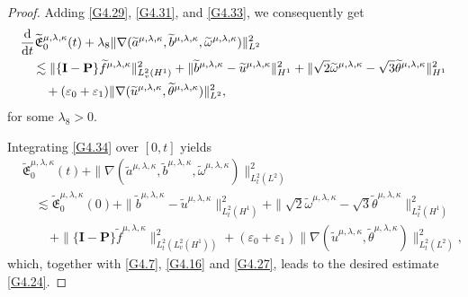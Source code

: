 \documentclass[reqno,11pt]{amsart}
\theoremstyle{plain}
\numberwithin{equation}{section}
\newcommand{\eps}{{\varepsilon}}
\begin{document}
\begin{proof}
Adding   \eqref{G4.29}, \eqref{G4.31}, and \eqref{G4.33}, we consequently get
\begin{align}\label{G4.34}
&\frac{{\rm d}}{{\rm d} t}\widetilde{\mathfrak{E}}^{\mu,\lambda,\kappa}_0(t)+\lambda_8 \|\nabla(\widetilde{a}^{\mu,\lambda,\kappa},\widetilde{b}^{\mu,\lambda,\kappa},\widetilde{\omega}^{\mu,\lambda,\kappa})\|_{L^2}^2\nonumber\\
&\quad\lesssim  \|\{\mathbf{I}-\mathbf{P}\} \widetilde{f}^{\mu,\lambda,\kappa}\|_{L_v^2 (H^1 )}^2+ \|\widetilde{b}^{\mu,\lambda,\kappa}-\widetilde{u}^{\mu,\lambda,\kappa}\|_{H^1}^2+\|\sqrt{2}\widetilde\omega^{\mu,\lambda,\kappa}-\sqrt{3}\widetilde{\theta}^{\mu,\lambda,\kappa}\|_{H^1}^2\nonumber\\
& \quad\quad+(\eps_0+\eps_1)\|\nabla( \widetilde{u}^{\mu,\lambda,\kappa},\widetilde{\theta}^{\mu,\lambda,\kappa})\|_{L^2}^2,   
\end{align}
for some $\lambda_8>0$.

Integrating \eqref{G4.34} over $[0,t]$ yields
\begin{align*}
&\widetilde{\mathfrak{E}}_0^{\mu,\lambda,\kappa}(t)+\|\nabla(\widetilde{a}^{\mu,\lambda,\kappa},\widetilde{b}^{\mu,\lambda,\kappa},\widetilde{\omega}^{\mu,\lambda,\kappa})\|_{L_t^2(L^2)}^2\nonumber\\
&\quad \lesssim\widetilde{\mathfrak{E}}_0^{\mu,\lambda,\kappa}(0)+\|\widetilde{b}^{\mu,\lambda,\kappa}-\widetilde{u}^{\mu,\lambda,\kappa}\|_{L_t^2(H^1)}^2
+\|\sqrt{2}\widetilde\omega^{\mu,\lambda,\kappa}-\sqrt{3}\widetilde{\theta}^{\mu,\lambda,\kappa}\|_{L_t^2(H^1)}^2\nonumber\\
&\qquad \, +\|\{\mathbf{I}-\mathbf{P}\} \widetilde{f}^{\mu,\lambda,\kappa}\|_{L_t^2(L_v^2 (H^1 ))}^2+(\eps_0+\eps_1)\|\nabla(\widetilde{u}^{\mu,\lambda,\kappa},\widetilde{\theta}^{\mu,\lambda,\kappa})\|_{L_t^2(L^2)}^2,
\end{align*}
which, together with \eqref{G4.7}, \eqref{G4.16}  and  \eqref{G4.27}, leads to  the desired estimate \eqref{G4.24}.
\end{proof}
\end{document}
